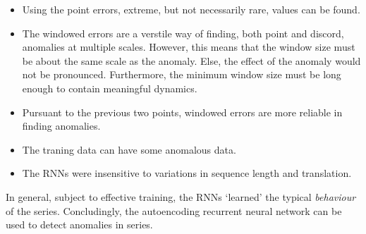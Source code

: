\begin{itemize}

\item 
  Using the point errors, extreme, but not necessarily rare, values can be found.

\item
  The windowed errors are a verstile way of finding, both point and discord, anomalies at multiple scales.
  However, this means that the window size must be about the same scale as the anomaly.
  Else, the effect of the anomaly would not be pronounced.
  Furthermore, the minimum window size must be long enough to contain meaningful dynamics.

\item
  Pursuant to the previous two points, windowed errors are more reliable in finding anomalies.

\item
  The traning data can have some anomalous data.

\item
  The RNNs were insensitive to variations in sequence length and translation.

\end{itemize}

In general, subject to effective training, the RNNs `learned' the typical \emph{behaviour} of the series.
%
Concludingly, the autoencoding recurrent neural network can be used to detect anomalies in series.



